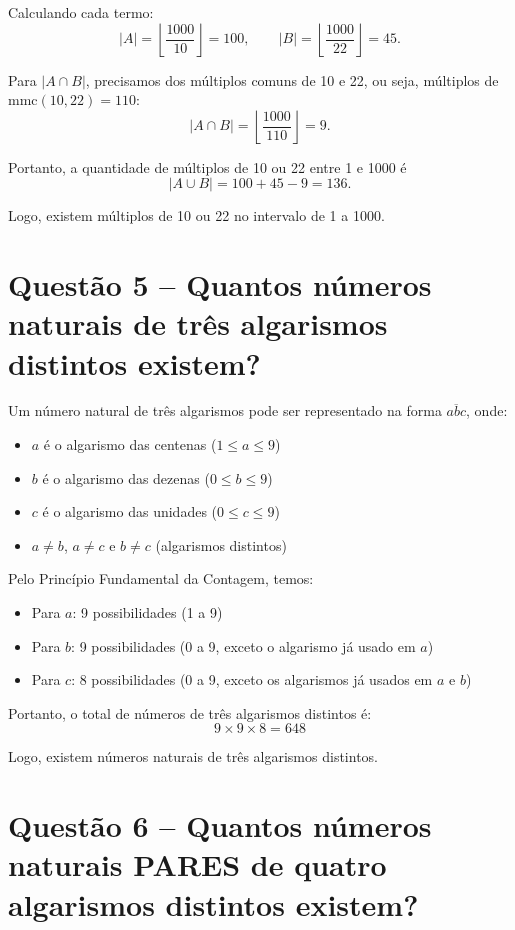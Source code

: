 \documentclass[12pt,a4paper]{article}
\begin{document}
    Calculando cada termo:
    \[
    |A| = \left\lfloor\frac{1000}{10}\right\rfloor = 100,\qquad
    |B| = \left\lfloor\frac{1000}{22}\right\rfloor = 45.
    \]
    
    Para $|A\cap B|$, precisamos dos múltiplos comuns de 10 e 22, ou seja, múltiplos de $\mathrm{mmc}(10,22) = 110$:
    \[
    |A\cap B| = \left\lfloor\frac{1000}{110}\right\rfloor = 9.
    \]
    
    Portanto, a quantidade de múltiplos de 10 ou 22 entre 1 e 1000 é
    \[
    |A\cup B| = 100 + 45 - 9 = \boxed{136}.
    \]
    
    Logo, existem  múltiplos de 10 ou 22 no intervalo de 1 a 1000.


\section*{Questão 5 -- Quantos números naturais de três algarismos distintos existem?}

    Um número natural de três algarismos pode ser representado na forma $\overline{abc}$, onde:
    \begin{itemize}
        \item $a$ é o algarismo das centenas ($1 \leq a \leq 9$)
        \item $b$ é o algarismo das dezenas ($0 \leq b \leq 9$)
        \item $c$ é o algarismo das unidades ($0 \leq c \leq 9$)
        \item $a \neq b$, $a \neq c$ e $b \neq c$ (algarismos distintos)
    \end{itemize}

    Pelo Princípio Fundamental da Contagem, temos:
    \begin{itemize}
        \item Para $a$: 9 possibilidades (1 a 9)
        \item Para $b$: 9 possibilidades (0 a 9, exceto o algarismo já usado em $a$)
        \item Para $c$: 8 possibilidades (0 a 9, exceto os algarismos já usados em $a$ e $b$)
    \end{itemize}

    Portanto, o total de números de três algarismos distintos é:
    \[
    9 \times 9 \times 8 = 648
    \]
    
    Logo, existem  números naturais de três algarismos distintos.

\section*{Questão 6 -- Quantos números naturais PARES de quatro algarismos distintos existem?}
\end{document}
